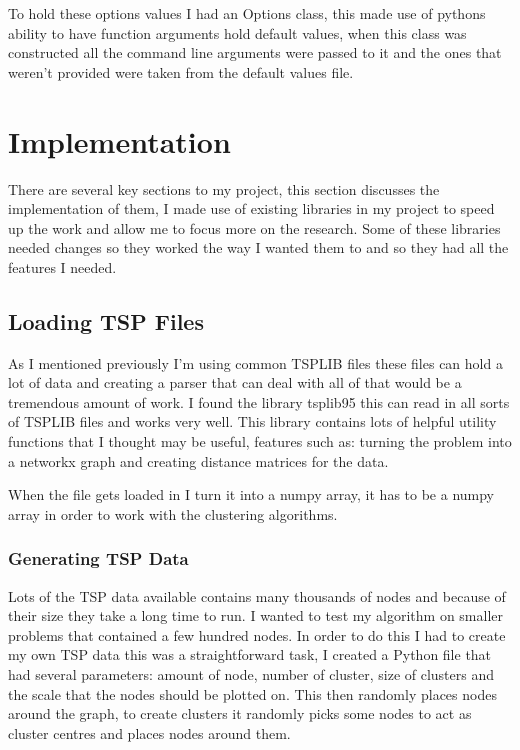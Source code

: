 To hold these options values I had an Options class, this made use of pythons ability to have function arguments hold default values, when this class was constructed all the command line arguments were passed to it and the ones that weren't provided were taken from the default values file.

\section{Implementation}

There are several key sections to my project, this section discusses the implementation of them, I made use of existing libraries in my project to speed up the work and allow me to focus more on the research. Some of these libraries needed changes so they worked the way I wanted them to and so they had all the features I needed. 

\subsection{Loading TSP Files}

As I mentioned previously I'm using common TSPLIB files these files can hold a lot of data and creating a parser that can deal with all of that would be a tremendous amount of work. I found the library tsplib95\cite{tsplib95} this can read in all sorts of TSPLIB files and works very well. This library contains lots of helpful utility functions that I thought may be useful, features such as: turning the problem into a networkx\cite{networkx} graph and creating distance matrices for the data.

When the file gets loaded in I turn it into a numpy\cite{numpy} array, it has to be a numpy array in order to work with the clustering algorithms. 

\subsubsection{Generating TSP Data}

Lots of the TSP data available contains many thousands of nodes and because of their size they take a long time to run. I wanted to test my algorithm on smaller problems that contained a few hundred nodes. In order to do this I had to create my own TSP data this was a straightforward task, I created a Python file that had several parameters: amount of node, number of cluster, size of clusters and the scale that the nodes should be plotted on. This then randomly places nodes around the graph, to create clusters it randomly picks some nodes to act as cluster centres and places nodes around them.

